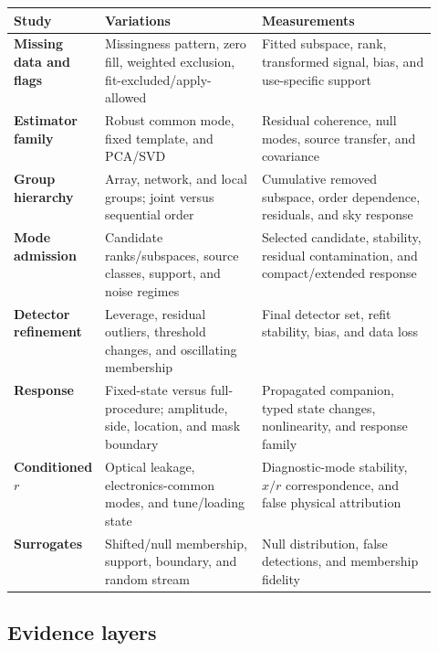 \documentclass[11pt]{article}
\begin{document}
\begin{table}[htbp]
\centering
\small
\setlength{\tabcolsep}{3pt}
\begin{tabularx}{\linewidth}{>{\raggedright\arraybackslash\bfseries}p{0.17\linewidth}
                              >{\raggedright\arraybackslash}p{0.37\linewidth}X}
\toprule
Study & Variations & Measurements \\
\midrule
Missing data and flags & Missingness pattern, zero fill, weighted exclusion, fit-excluded/apply-allowed & Fitted subspace, rank, transformed signal, bias, and use-specific support \\
Estimator family & Robust common mode, fixed template, and PCA/SVD & Residual coherence, null modes, source transfer, and covariance \\
Group hierarchy & Array, network, and local groups; joint versus sequential order & Cumulative removed subspace, order dependence, residuals, and sky response \\
Mode admission & Candidate ranks/subspaces, source classes, support, and noise regimes & Selected candidate, stability, residual contamination, and compact/extended response \\
Detector refinement & Leverage, residual outliers, threshold changes, and oscillating membership & Final detector set, refit stability, bias, and data loss \\
Response & Fixed-state versus full-procedure; amplitude, side, location, and mask boundary & Propagated companion, typed state changes, nonlinearity, and response family \\
Conditioned $r$ & Optical leakage, electronics-common modes, and tune/loading state & Diagnostic-mode stability, $x/r$ correspondence, and false physical attribution \\
Surrogates & Shifted/null membership, support, boundary, and random stream & Null distribution, false detections, and membership fidelity \\
\bottomrule
\end{tabularx}
\end{table}

\subsection{Evidence layers}
\end{document}
